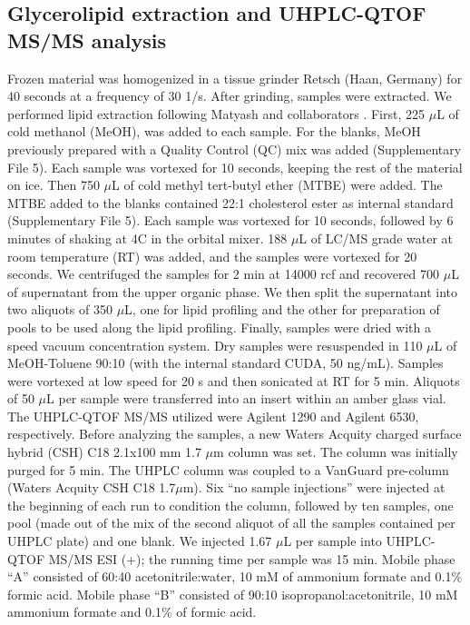 \documentclass[9pt,twocolumn,twoside,lineno]{BioRxiv}
\begin{document}
\subsection{Glycerolipid extraction and UHPLC-QTOF MS/MS analysis} 
Frozen material was homogenized in a tissue grinder Retsch (Haan, Germany) for 40 seconds at a frequency of 30 1/s. 
After grinding, samples were extracted. 
We performed lipid extraction following Matyash and collaborators \cite{Matyash2008-ue}. 
First, 225 $\mu$L of cold methanol (MeOH), was added to each sample. 
For the blanks, MeOH previously prepared with a Quality Control (QC) mix was added (Supplementary File 5).
Each sample was vortexed for 10 seconds, keeping the rest of the material on ice. 
Then 750 $\mu$L of cold methyl tert-butyl ether (MTBE) were added. 
The MTBE added to the blanks contained 22:1 cholesterol ester as internal standard (Supplementary File 5). 
Each sample was vortexed for 10 seconds, followed by 6 minutes of shaking at 4\degree C in the orbital mixer. 
188 $\mu$L of LC/MS grade water at room temperature (RT) was added, and the samples were vortexed for 20 seconds.
We centrifuged the samples for 2 min at 14000 rcf and recovered 700 $\mu$L of supernatant from the upper organic phase. 
We then split the supernatant into two aliquots of 350 $\mu$L, one for lipid profiling and the other for preparation of pools to be used along the lipid profiling. 
Finally, samples were dried with a speed vacuum concentration system.
Dry samples were resuspended in 110 $\mu$L of MeOH-Toluene 90:10 (with the internal standard CUDA, 50 ng/mL). 
Samples were vortexed at low speed for 20 s and then sonicated at RT for 5 min. 
Aliquots of 50 $\mu$L per sample were transferred into an insert within an amber glass vial.
The UHPLC-QTOF MS/MS utilized were Agilent 1290 and Agilent 6530, respectively. 
Before analyzing the samples, a new Waters Acquity charged surface hybrid (CSH) C18 2.1x100 mm 1.7 $\mu$m column was set. 
The column was initially purged for 5 min. 
The UHPLC column was coupled to a VanGuard pre-column (Waters Acquity CSH C18 1.7$\mu$m). 
Six “no sample injections” were injected at the beginning of each run to condition the column, followed by ten samples, one pool (made out of the mix of the second aliquot of all the samples contained per UHPLC plate) and one blank.
We injected 1.67 $\mu$L per sample into UHPLC-QTOF MS/MS ESI (+); the running time per sample was 15 min. 
Mobile phase “A” consisted of 60:40 acetonitrile:water, 10 mM of ammonium formate and 0.1\% formic acid. 
Mobile phase “B” consisted of 90:10 isopropanol:acetonitrile, 10 mM ammonium formate and 0.1\% of formic acid. 
\end{document}
